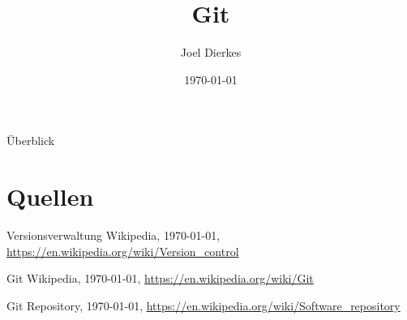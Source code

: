 \documentclass{beamer}
\title{Git}
\author{Joel Dierkes}
\date{\today}
\begin{document}
\maketitle
\begin{frame}{Überblick}
\tableofcontents
\end{frame}



\section{Quellen}
\begin{thebibliography}{9}

  Versionsverwaltung Wikipedia,
  \today,
  \url{https://en.wikipedia.org/wiki/Version_control}

  Git Wikipedia,
  \today,
  \url{https://en.wikipedia.org/wiki/Git}

  Git Repository,
  \today,
  \url{https://en.wikipedia.org/wiki/Software_repository}

\end{thebibliography}
\end{document}
